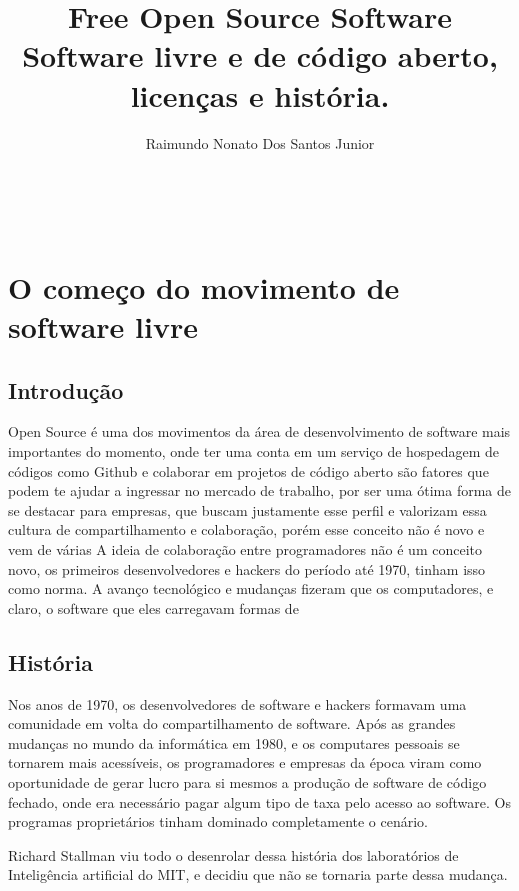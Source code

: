 \documentclass[12pt, a4paper]{report}
\title{Free Open Source Software\\\LARGE\vspace{0.5em} Software livre e de código aberto, licenças e história.}
\author{Raimundo Nonato Dos Santos Junior}
\renewcommand{\maketitle}{
  \begin{center}

  \vspace*{\fill}
  {\huge\bfseries\thetitle}\\
  \vspace{1.2em}
  {\large\bfseries\theauthor}
  \vspace*{\fill}
  \end{center}

  \newpage
}
\begin{document}

\maketitle

\tableofcontents

\chapter{O começo do movimento de software livre}

\section{Introdução}


Open Source é uma dos movimentos da área de desenvolvimento de software mais importantes do momento, onde ter uma conta em um serviço de hospedagem de códigos como Github e colaborar em projetos de código aberto são fatores que podem te ajudar a ingressar no mercado de trabalho, por ser uma ótima forma de se destacar para empresas, que buscam justamente esse perfil e valorizam essa cultura de compartilhamento e colaboração, porém esse conceito não é novo e vem de várias
A ideia de colaboração entre programadores não é um conceito novo, os primeiros desenvolvedores e hackers do período até 1970, tinham isso como norma.
A avanço tecnológico e mudanças fizeram que os computadores, e claro, o software que eles carregavam formas de 

\section{História}

Nos anos de 1970, os desenvolvedores de software e hackers formavam uma comunidade em volta do compartilhamento de software. Após as grandes mudanças no mundo da informática em 1980, e os computares pessoais se tornarem mais acessíveis, os programadores e empresas da época viram como oportunidade de gerar lucro para si mesmos a produção de software de código fechado, onde era necessário pagar algum tipo de taxa pelo acesso ao software. Os programas proprietários tinham dominado completamente o cenário.

Richard Stallman viu todo o desenrolar dessa história dos laboratórios de Inteligência artificial do MIT, e decidiu que não se tornaria parte dessa mudança. 
\end{document}
